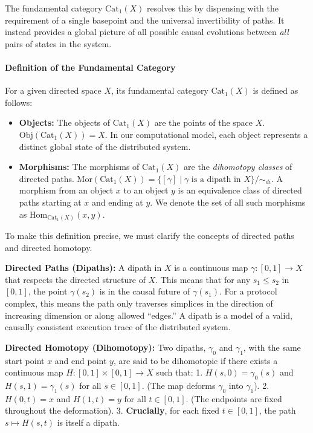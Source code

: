 \documentclass[
]{article}
\begin{document}
The fundamental category \(\text{Cat}_1(X)\) resolves this by dispensing
with the requirement of a single basepoint and the universal
invertibility of paths. It instead provides a global picture of all
possible causal evolutions between \emph{all} pairs of states in the
system.

\paragraph{Definition of the Fundamental
Category}\label{definition-of-the-fundamental-category}

For a given directed space \(X\), its fundamental category
\(\text{Cat}_1(X)\) is defined as follows:

\begin{itemize}
\item
  \textbf{Objects:} The objects of \(\text{Cat}_1(X)\) are the points of
  the space \(X\). \(\text{Obj}(\text{Cat}_1(X)) = X\). In our
  computational model, each object represents a distinct global state of
  the distributed system.
\item
  \textbf{Morphisms:} The morphisms of \(\text{Cat}_1(X)\) are the
  \emph{dihomotopy classes} of directed paths.
  \(\text{Mor}(\text{Cat}_1(X)) = \{[\gamma] \mid \gamma \text{ is a dipath in } X\}/\sim_{di}\).
  A morphism from an object \(x\) to an object \(y\) is an equivalence
  class of directed paths starting at \(x\) and ending at \(y\). We
  denote the set of all such morphisms as
  \(\text{Hom}_{\text{Cat}_1(X)}(x, y)\).
\end{itemize}

To make this definition precise, we must clarify the concepts of
directed paths and directed homotopy.

\textbf{Directed Paths (Dipaths):} A dipath in \(X\) is a continuous map
\(\gamma: [0, 1] \to X\) that respects the directed structure of \(X\).
This means that for any \(s_1 \le s_2\) in \([0, 1]\), the point
\(\gamma(s_2)\) is in the causal future of \(\gamma(s_1)\). For a
protocol complex, this means the path only traverses simplices in the
direction of increasing dimension or along allowed ``edges.'' A dipath
is a model of a valid, causally consistent execution trace of the
distributed system.

\textbf{Directed Homotopy (Dihomotopy):} Two dipaths, \(\gamma_0\) and
\(\gamma_1\), with the same start point \(x\) and end point \(y\), are
said to be dihomotopic if there exists a continuous map
\(H: [0, 1] \times [0, 1] \to X\) such that: 1.
\(H(s, 0) = \gamma_0(s)\) and \(H(s, 1) = \gamma_1(s)\) for all
\(s \in [0, 1]\). (The map deforms \(\gamma_0\) into \(\gamma_1\)). 2.
\(H(0, t) = x\) and \(H(1, t) = y\) for all \(t \in [0, 1]\). (The
endpoints are fixed throughout the deformation). 3. \textbf{Crucially},
for each fixed \(t \in [0, 1]\), the path \(s \mapsto H(s, t)\) is
itself a dipath.
\end{document}
